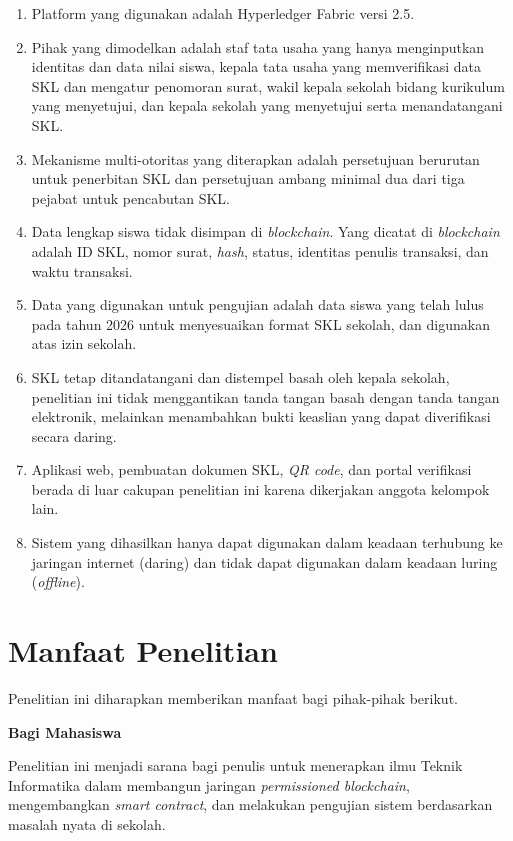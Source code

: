 \begin{enumerate}
    \item Platform yang digunakan adalah Hyperledger Fabric versi 2.5.
    \item Pihak yang dimodelkan adalah staf tata usaha yang hanya menginputkan identitas dan data nilai siswa, kepala tata usaha yang memverifikasi data SKL dan mengatur penomoran surat, wakil kepala sekolah bidang kurikulum yang menyetujui, dan kepala sekolah yang menyetujui serta menandatangani SKL.
    \item Mekanisme multi-otoritas yang diterapkan adalah persetujuan berurutan untuk penerbitan SKL dan persetujuan ambang minimal dua dari tiga pejabat untuk pencabutan SKL.
    \item Data lengkap siswa tidak disimpan di \textit{blockchain}. Yang dicatat di \textit{blockchain} adalah ID SKL, nomor surat, \textit{hash}, status, identitas penulis transaksi, dan waktu transaksi.
    \item Data yang digunakan untuk pengujian adalah data siswa yang telah lulus pada tahun 2026 untuk menyesuaikan format SKL sekolah, dan digunakan atas izin sekolah.
    \item SKL tetap ditandatangani dan distempel basah oleh kepala sekolah, penelitian ini tidak menggantikan tanda tangan basah dengan tanda tangan elektronik, melainkan menambahkan bukti keaslian yang dapat diverifikasi secara daring.
    \item Aplikasi web, pembuatan dokumen SKL, \textit{QR code}, dan portal verifikasi berada di luar cakupan penelitian ini karena dikerjakan anggota kelompok lain.
    \item Sistem yang dihasilkan hanya dapat digunakan dalam keadaan terhubung ke jaringan internet (daring) dan tidak dapat digunakan dalam keadaan luring (\textit{offline}).
\end{enumerate}

\section{Manfaat Penelitian}
Penelitian ini diharapkan memberikan manfaat bagi pihak-pihak berikut.

\textbf{Bagi Mahasiswa}

Penelitian ini menjadi sarana bagi penulis untuk menerapkan ilmu Teknik Informatika dalam membangun jaringan \textit{permissioned blockchain}, mengembangkan \textit{smart contract}, dan melakukan pengujian sistem berdasarkan masalah nyata di sekolah.\par

